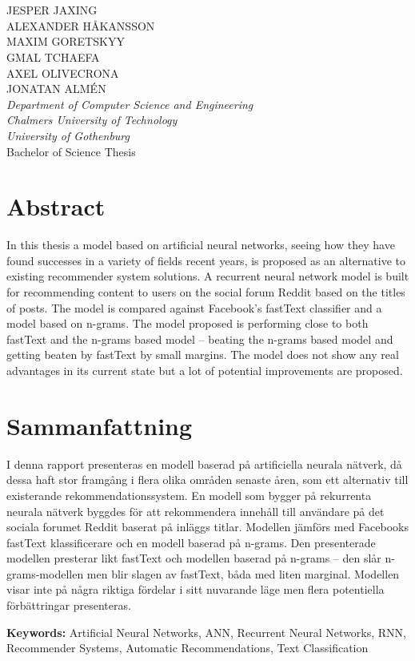 \large
\begin{flushleft}
\textbf{\varthetitle}\\
\varthesubtitle\\[0.7cm]
\end{flushleft}
JESPER JAXING\\
ALEXANDER HÅKANSSON\\
MAXIM GORETSKYY\\
GMAL TCHAEFA\\
AXEL OLIVECRONA\\
JONATAN ALMÉN\\
\normalsize
\textit{Department of Computer Science and Engineering\\
Chalmers University of Technology\\
University of Gothenburg}\\[0.7cm]
Bachelor of Science Thesis
\setlength{\parskip}{0.5cm}

\thispagestyle{plain}			%
\setlength{\parskip}{0pt plus 1.0pt}
\section*{Abstract}
In this thesis a model based on artificial neural networks, seeing how they have found successes in a variety of fields recent years, is proposed as an alternative to existing recommender system solutions. A recurrent neural network model is built for recommending content to users on the social forum Reddit based on the titles of posts. The model is compared against Facebook's fastText classifier and a model based on n-grams. The model proposed is performing close to both fastText and the n-grams based model -- beating the n-grams based model and getting beaten by fastText by small margins. The model does not show any real advantages in its current state but a lot of potential improvements are proposed.

\section*{Sammanfattning}
I denna rapport presenteras en modell baserad på artificiella neurala nätverk, då dessa haft stor framgång i flera olika områden senaste åren, som ett alternativ till existerande rekommendationssystem. En modell som bygger på rekurrenta neurala nätverk byggdes för att rekommendera innehåll till användare på det sociala forumet Reddit baserat på inläggs titlar. Modellen jämförs med Facebooks fastText klassificerare och en modell baserad på n-grams. Den presenterade modellen presterar likt fastText och modellen baserad på n-grams -- den slår n-grams-modellen men blir slagen av fastText, båda med liten marginal. Modellen visar inte på några riktiga fördelar i sitt nuvarande läge men flera potentiella förbättringar presenteras.

\vfill
\textbf{Keywords:} Artificial Neural Networks, ANN, Recurrent Neural Networks, RNN, Recommender Systems, Automatic Recommendations, Text Classification

\newpage				%
\thispagestyle{empty}
\mbox{}